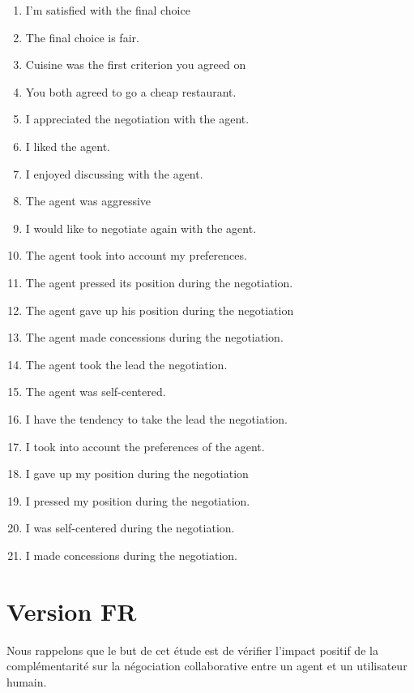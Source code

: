 \documentclass [french]{paper}
\begin{document}
			\begin{enumerate}
				\item I'm satisfied with the final choice
				\item The final choice is fair.
				\item Cuisine was the first criterion you agreed on 
				\item  You both agreed to go a cheap restaurant.
				\item I appreciated the negotiation with the agent.
				\item I liked the agent.
				\item I enjoyed discussing with the agent.
				\item The agent was aggressive
				\item I would like to negotiate again with the agent.				
				
				\item The agent took into account my preferences.
				\item The agent pressed its position during the negotiation.
				\item The agent gave up his position during the negotiation
				\item The agent made concessions during the negotiation.
				\item The agent took the lead the negotiation.
				\item The agent was self-centered.
				
				\item I have the tendency to take the lead the negotiation.
				\item I took into account the preferences of the agent.
				\item I gave up my position during the negotiation
				\item I pressed my position during the negotiation.
				\item I was self-centered during the negotiation.
				\item I made concessions during the negotiation.
				

				
			
				
			\end{enumerate}
			
	
	\section{Version FR}
		Nous rappelons que le but de cet étude est de vérifier l'impact positif de la complémentarité sur la négociation collaborative entre un agent et un utilisateur humain. 
		
\end{document}
